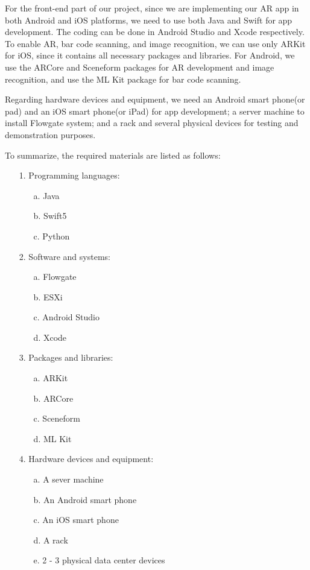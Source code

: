 \documentclass[11pt,a4paper]{article}
\begin{document}
\begin{onehalfspace}
For the front-end part of our project, since we are implementing our AR app in both Android and iOS platforms, we need to use both Java and Swift for app development. The coding can be done in Android Studio and Xcode respectively. To enable AR, bar code scanning, and image recognition, we can use only ARKit for iOS, since it contains all necessary packages and libraries. For Android, we use the ARCore and Sceneform packages for AR development and image recognition, and use the ML Kit package for bar code scanning.

Regarding hardware devices and equipment, we need an Android smart phone(or pad) and an iOS smart phone(or iPad)  for app development; a server machine to install Flowgate system; and a rack and several physical devices for testing and demonstration purposes.

To summarize, the required materials are listed as follows:

\begin{itemize}
    \item[1.] Programming languages:
    \begin{itemize}
        \item[a.] Java
        \item[b.] Swift5
        \item[c.] Python
    \end{itemize}
    
    \item[2.] Software and systems:
    \begin{itemize}
        \item[a.] Flowgate
        \item[b.] ESXi
        \item[c.] Android Studio
        \item[d.] Xcode
    \end{itemize}
    
    \item[3.] Packages and libraries:
    \begin{itemize}
        \item[a.] ARKit
        \item[b.] ARCore
        \item[c.] Sceneform
        \item[d.] ML Kit
    \end{itemize}
    
	\item[4.] Hardware devices and equipment:
	\begin{itemize}
        \item[a.] A sever machine
        \item[b.] An Android smart phone
        \item[c.] An iOS smart phone
        \item[d.] A rack
        \item[e.] 2 - 3 physical data center devices
    \end{itemize}
    

\end{itemize}
\end{onehalfspace}
\end{document}
